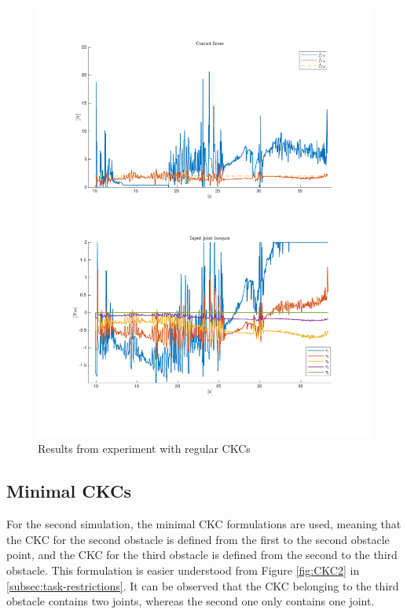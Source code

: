 \begin{figure}[H]
    \centering
    \includegraphics[trim=2cm 2cm 2cm 2cm, clip=true, width=\textwidth]{figures/experiments/2xf/bigJ-2plot.pdf}
    \caption{Results from experiment with regular CKCs}
    \label{fig:2xf-bigJ}
\end{figure}

\subsection{Minimal CKCs}

For the second simulation, the minimal CKC formulations are used, meaning that the CKC for the second obstacle is defined from the first to the second obstacle point, and the CKC for the third obstacle is defined from the second to the third obstacle. This formulation is easier understood from Figure \ref{fig:CKC2} in \ref{subsec:task-restrictions}. It can be observed that the CKC belonging to the third obstacle contains two joints, whereas the second one only contains one joint.

